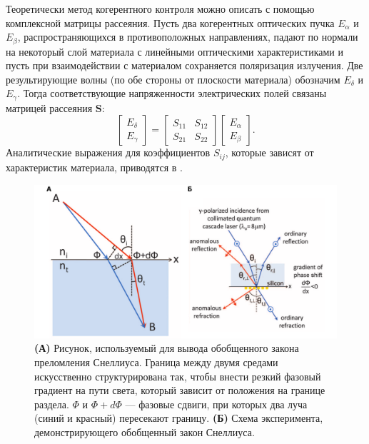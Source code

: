 Теоретически метод когерентного контроля можно описать с помощью комплексной матрицы рассеяния. Пусть два когерентных оптических пучка $E_\alpha$ и $E_\beta$, распространяющихся в противоположных направлениях, падают по нормали на некоторый слой материала с линейными оптическими характеристиками и пусть при взаимодействии с материалом сохраняется поляризация излучения. Две результирующие волны (по обе стороны от плоскости материала) обозначим $E_\delta$ и $E_\gamma$. Тогда соответствующие напряженности электрических полей связаны матрицей рассеяния $\mathbf{S}$:
\begin{equation}
    \begin{bmatrix}
        E_\delta \\
        E_\gamma
    \end{bmatrix} = \begin{bmatrix}
        S_{11} & S_{12} \\
        S_{21} & S_{22}
    \end{bmatrix} \begin{bmatrix}
        E_\alpha \\
        E_\beta
    \end{bmatrix}.
    \label{eq:scatteringMatrix}
\end{equation}
Аналитические выражения для коэффициентов $S_{ij}$, которые зависят от характеристик материала, приводятся в \cite{CPATheory2015}.

\begin{figure}
    \begin{center}
        \includegraphics[width=\textwidth]{pictures/Generalized_Snell's_law.png}
        \caption{\textbf{(А)} Рисунок, используемый для вывода обобщенного закона преломления Снеллиуса. Граница между двумя средами искусственно структурирована так, чтобы внести резкий фазовый градиент на пути света, который зависит от положения на границе раздела. $\Phi$ и $\Phi + d\Phi$ — фазовые сдвиги, при которых два луча (синий и красный) пересекают границу\cite{generalized2011}. \textbf{(Б)} Схема эксперимента, демонстрирующего обобщенный закон Снеллиуса\cite{generalized2011}.}
        \label{fig:generalized}
    \end{center}
\end{figure}

